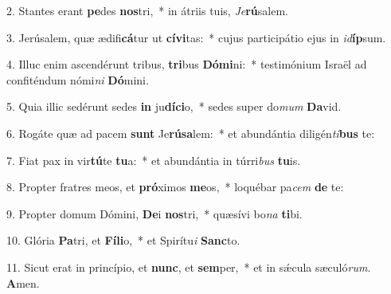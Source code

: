 2. Stantes erant \textbf{pe}des \textbf{nos}tri,~*  in átriis tuis, \textit{Je}\textbf{rú}salem.\

3. Jerúsalem, quæ ædifi\textbf{cá}tur ut \textbf{cí}\textbf{vi}tas:~*  cujus participátio ejus in \textit{id}\textbf{íp}sum.\

4. Illuc enim ascendérunt tribus, \textbf{tri}bus \textbf{Dó}\textbf{mi}ni:~*  testimónium Israël ad confiténdum nómi\textit{ni} \textbf{Dó}mini.\

5. Quia illic sedérunt sedes \textbf{in} ju\textbf{dí}\textbf{ci}o,~*  sedes super do\textit{mum} \textbf{Da}vid.\

6. Rogáte quæ ad pacem \textbf{sunt} Je\textbf{rú}\textbf{sa}lem:~*  et abundántia diligén\textit{ti}\textbf{bus} te:\

7. Fiat pax in vir\textbf{tú}te \textbf{tu}a:~*  et abundántia in túrri\textit{bus} \textbf{tu}is.\

8. Propter fratres meos, et \textbf{pró}ximos \textbf{me}os,~*  loquébar pa\textit{cem} \textbf{de} te:\

9. Propter domum Dómini, \textbf{De}i \textbf{nos}tri,~*  quæsívi bo\textit{na} \textbf{ti}bi.\

10. Glória \textbf{Pa}tri, et \textbf{Fí}\textbf{li}o,~*  et Spirítu\textit{i} \textbf{Sanc}to.\

11. Sicut erat in princípio, et \textbf{nunc}, et \textbf{sem}per,~*  et in sǽcula sæculó\textit{rum}. \textbf{A}men.\


